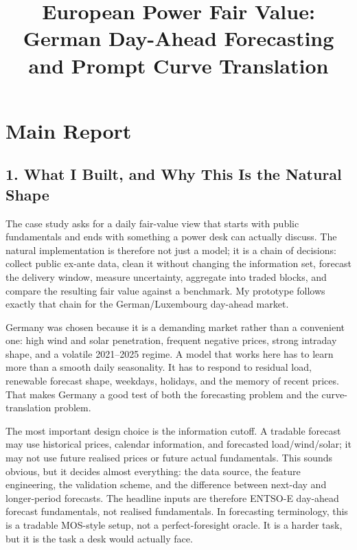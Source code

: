 \documentclass[10pt,a4paper]{article}
\title{\vspace{-2.1em}\large European Power Fair Value: German Day-Ahead Forecasting and Prompt Curve Translation}
\author{}
\date{\vspace{-1.4em}}
\begin{document}
\maketitle
\thispagestyle{fancy}
\vspace{-3.0em}

\section*{Main Report}

\subsection*{1. What I Built, and Why This Is the Natural Shape}
The case study asks for a daily fair-value view that starts with public fundamentals and ends with something a power desk can actually discuss. The natural implementation is therefore not just a model; it is a chain of decisions: collect public ex-ante data, clean it without changing the information set, forecast the delivery window, measure uncertainty, aggregate into traded blocks, and compare the resulting fair value against a benchmark. My prototype follows exactly that chain for the German/Luxembourg day-ahead market.

Germany was chosen because it is a demanding market rather than a convenient one: high wind and solar penetration, frequent negative prices, strong intraday shape, and a volatile 2021--2025 regime. A model that works here has to learn more than a smooth daily seasonality. It has to respond to residual load, renewable forecast shape, weekdays, holidays, and the memory of recent prices. That makes Germany a good test of both the forecasting problem and the curve-translation problem.

The most important design choice is the information cutoff. A tradable forecast may use historical prices, calendar information, and forecasted load/wind/solar; it may not use future realised prices or future actual fundamentals. This sounds obvious, but it decides almost everything: the data source, the feature engineering, the validation scheme, and the difference between next-day and longer-period forecasts. The headline inputs are therefore ENTSO-E day-ahead forecast fundamentals, not realised fundamentals. In forecasting terminology, this is a tradable MOS-style setup, not a perfect-foresight oracle. It is a harder task, but it is the task a desk would actually face.
\end{document}

